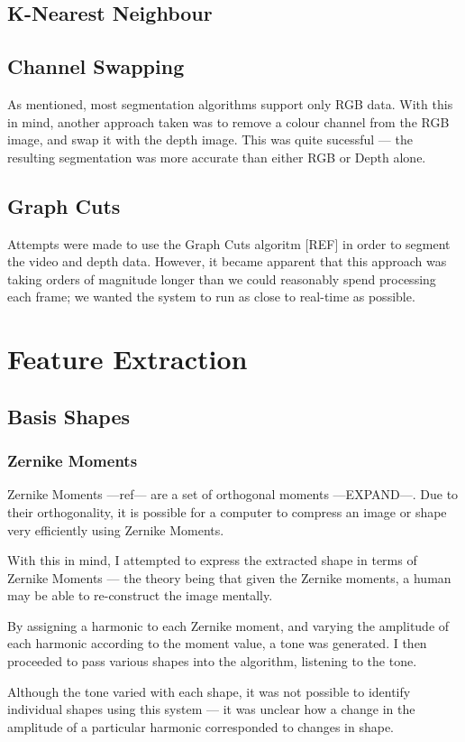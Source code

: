 \subsection{K-Nearest Neighbour}

\subsection{Channel Swapping}
As mentioned, most segmentation algorithms support only RGB data. With this in mind, another approach taken was to remove a colour channel from the RGB image, and swap it with the depth image. This was quite sucessful --- the resulting segmentation was more accurate than either RGB or Depth alone.

\subsection{Graph Cuts}
Attempts were made to use the Graph Cuts algoritm [REF] in order to segment the video and depth data. However, it became apparent that this approach was taking orders of magnitude longer than we could reasonably spend processing each frame; we wanted the system to run as close to real-time as possible.

\section{Feature Extraction}

\subsection{Basis Shapes}

\subsubsection{Zernike Moments}
Zernike Moments ---ref--- are a set of orthogonal moments ---EXPAND---. Due to their orthogonality, it is possible for a computer to compress an image or shape very efficiently using Zernike Moments. 

With this in mind, I attempted to express the extracted shape in terms of Zernike Moments --- the theory being that given the Zernike moments, a human may be able to re-construct the image mentally.

By assigning a harmonic to each Zernike moment, and varying the amplitude of each harmonic according to the moment value, a tone was generated. I then proceeded to pass various shapes into the algorithm, listening to the tone.

Although the tone varied with each shape, it was not possible to identify individual shapes using this system --- it was unclear how a change in the amplitude of a particular harmonic corresponded to changes in shape. 

